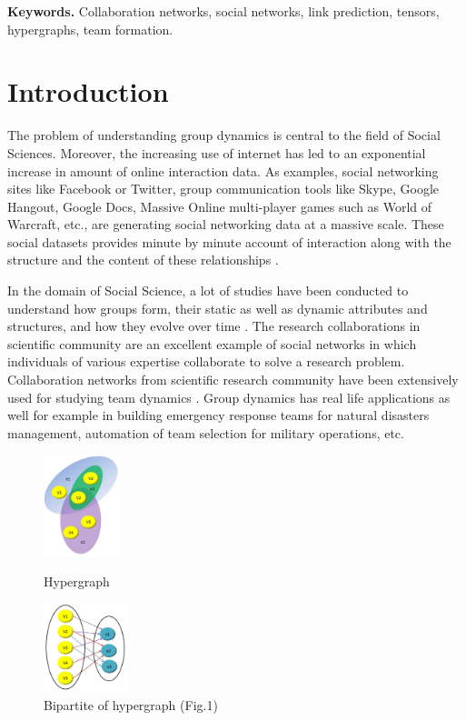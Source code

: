 \documentclass[twoside,leqno,twocolumn]{article}
\begin{document}
 
\smallskip
\noindent \textbf{Keywords.} Collaboration networks, social networks, link prediction, tensors, hypergraphs, team formation.

\section{Introduction}

The problem of understanding group dynamics is central to the field of Social Sciences. Moreover, the increasing use of internet has led to an exponential increase in amount of online interaction data. As examples, social networking sites like Facebook or Twitter, group communication tools like Skype, Google Hangout, Google Docs, Massive Online multi-player games such as World of Warcraft, etc., are generating social networking data at a massive scale. These social datasets provides minute by minute account of interaction along with the structure and the content of these relationships \cite{Vázquez28122004}. 

In the domain of Social Science, a lot of studies have been conducted to understand how groups form, their static as well as dynamic attributes and structures, and how they evolve over time \cite{coleman1988social}. The research collaborations in scientific community are an excellent example of social networks in which individuals of various expertise collaborate to solve a research problem. Collaboration networks from scientific research community have been extensively used for studying team dynamics \cite{katz1997research}\cite{newman2001structure}\cite{barabasi2002evolution}. Group dynamics has real life applications as well for example in building emergency response teams for natural disasters management, automation of team selection for military operations, etc. 

\begin{figure}[ht]
\begin{minipage}[b]{0.40\linewidth}
\centering
\includegraphics[width=22mm]{hypergraph.JPG}
\caption{Hypergraph}
\label{fig:figure1}
\end{minipage}
\hspace{0.5cm}
\begin{minipage}[b]{0.40\linewidth}
\centering
\includegraphics[width=25mm]{bipartite.JPG}
\caption{Bipartite of hypergraph (Fig.1)}
\label{fig:figure2}
\end{minipage}
\vspace{-1.1em}
\end{figure}
\end{document}
